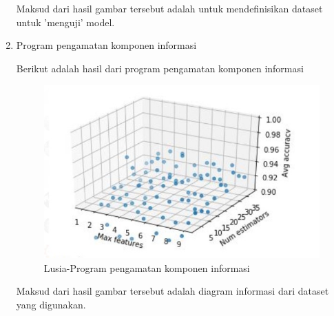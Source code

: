 \begin{enumerate}
	\par Maksud dari hasil gambar tersebut adalah untuk mendefinisikan dataset untuk 'menguji' model.
	
\item Program pengamatan komponen informasi
	\par Berikut adalah hasil dari program pengamatan komponen informasi
		\begin{figure}[ht]
		\centering
		\includegraphics[scale=0.5]{figures/n8.jpg}
		\caption{Lusia-Program pengamatan komponen informasi}
		\label{contoh}
		\end{figure}
		
	\par Maksud dari hasil gambar tersebut adalah diagram informasi dari dataset yang digunakan.

\end{enumerate}

